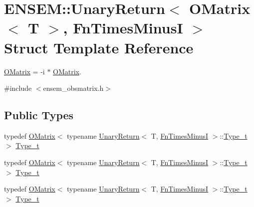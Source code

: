 \hypertarget{structENSEM_1_1UnaryReturn_3_01OMatrix_3_01T_01_4_00_01FnTimesMinusI_01_4}{}\section{E\+N\+S\+EM\+:\+:Unary\+Return$<$ O\+Matrix$<$ T $>$, Fn\+Times\+MinusI $>$ Struct Template Reference}
\label{structENSEM_1_1UnaryReturn_3_01OMatrix_3_01T_01_4_00_01FnTimesMinusI_01_4}


\mbox{\hyperlink{classENSEM_1_1OMatrix}{O\+Matrix}} = -\/i $\ast$ \mbox{\hyperlink{classENSEM_1_1OMatrix}{O\+Matrix}}.  




{\ttfamily \#include $<$ensem\+\_\+obsmatrix.\+h$>$}

\subsection*{Public Types}
\begin{DoxyCompactItemize}
\item 
typedef \mbox{\hyperlink{classENSEM_1_1OMatrix}{O\+Matrix}}$<$ typename \mbox{\hyperlink{structENSEM_1_1UnaryReturn}{Unary\+Return}}$<$ T, \mbox{\hyperlink{structENSEM_1_1FnTimesMinusI}{Fn\+Times\+MinusI}} $>$\+::\mbox{\hyperlink{structENSEM_1_1UnaryReturn_3_01OMatrix_3_01T_01_4_00_01FnTimesMinusI_01_4_a61e8ab0fd80b071e9277449e6f8bd901}{Type\+\_\+t}} $>$ \mbox{\hyperlink{structENSEM_1_1UnaryReturn_3_01OMatrix_3_01T_01_4_00_01FnTimesMinusI_01_4_a61e8ab0fd80b071e9277449e6f8bd901}{Type\+\_\+t}}
\item 
typedef \mbox{\hyperlink{classENSEM_1_1OMatrix}{O\+Matrix}}$<$ typename \mbox{\hyperlink{structENSEM_1_1UnaryReturn}{Unary\+Return}}$<$ T, \mbox{\hyperlink{structENSEM_1_1FnTimesMinusI}{Fn\+Times\+MinusI}} $>$\+::\mbox{\hyperlink{structENSEM_1_1UnaryReturn_3_01OMatrix_3_01T_01_4_00_01FnTimesMinusI_01_4_a61e8ab0fd80b071e9277449e6f8bd901}{Type\+\_\+t}} $>$ \mbox{\hyperlink{structENSEM_1_1UnaryReturn_3_01OMatrix_3_01T_01_4_00_01FnTimesMinusI_01_4_a61e8ab0fd80b071e9277449e6f8bd901}{Type\+\_\+t}}
\item 
typedef \mbox{\hyperlink{classENSEM_1_1OMatrix}{O\+Matrix}}$<$ typename \mbox{\hyperlink{structENSEM_1_1UnaryReturn}{Unary\+Return}}$<$ T, \mbox{\hyperlink{structENSEM_1_1FnTimesMinusI}{Fn\+Times\+MinusI}} $>$\+::\mbox{\hyperlink{structENSEM_1_1UnaryReturn_3_01OMatrix_3_01T_01_4_00_01FnTimesMinusI_01_4_a61e8ab0fd80b071e9277449e6f8bd901}{Type\+\_\+t}} $>$ \mbox{\hyperlink{structENSEM_1_1UnaryReturn_3_01OMatrix_3_01T_01_4_00_01FnTimesMinusI_01_4_a61e8ab0fd80b071e9277449e6f8bd901}{Type\+\_\+t}}
\end{DoxyCompactItemize}


